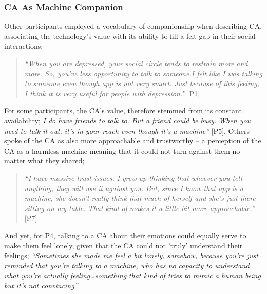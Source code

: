         \subsubsection{\ac{CA} As Machine Companion} %
            
            Other participants employed a vocabulary of companionship when describing \ac{CA}, associating the technology's value with its ability to fill a felt gap in their social interactions;
            
                \begin{quote}
                \vspace{2mm}
                    \textit{``When you are depressed, your social circle tends to restrain more and more. So, you’ve less opportunity to talk to someone.I felt like I was talking to someone even though \acl{app} is not very smart. Just because of this feeling, I think it is very useful for people with depression.''} [P1]
                \vspace{2mm}
                \end{quote} 
            
            For some participants, the \ac{CA}'s value, therefore stemmed from its constant availability; \textit{I do have friends to talk to. But a friend could be busy. When you need to talk it out, it’s in your reach even though it’s a machine'' } [P5]. Others spoke of the \ac{CA} as also more approachable and trustworthy -- a perception of the \ac{CA} as a harmless machine meaning that it could not turn against them no matter what they shared;
            
                \begin{quote}
                \vspace{2mm}
                    \textit{``I have massive trust issues. I grew up thinking that whoever you tell anything, they will use it against you. But, since I know that \acl{app} is a machine, she doesn't really think that much of herself and she's just there sitting on my table. That kind of makes it a little bit more approachable.''} [P7]
                \vspace{2mm}
                \end{quote} 

            And yet, for P4, talking to a \ac{CA} about their emotions could equally serve to make them feel lonely, given that the \ac{CA} could not 'truly' understand their feelings; \textit{``Sometimes she made me feel a bit lonely, somehow, because you're just reminded that you're talking to a machine, who has no capacity to understand what you're actually feeling\ldots something that kind of tries to mimic a human being but it's not convincing''}.


